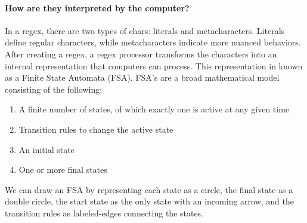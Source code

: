 \documentclass[10pt]{article}
\begin{document}
\paragraph{How are they interpreted by the computer?}
In a regex, there are two types of chars: literals and metacharacters.
Literals define regular characters, while metacharacters indicate
more nuanced behaviors.
After creating a regex, a regex processor transforms the characters into an internal
representation that computers can process.
This representation in known as a Finite State Automata (FSA).
FSA's are a broad mathematical model consisting of the following:
\begin{enumerate}
\item A finite number of states, of which exactly one is active at any given time
\item Transition rules to change the active state
\item An initial state
\item One or more final states
\end{enumerate}
We can draw an FSA by representing each state as a circle, the final state
as a double circle, the start state as the only state with an incoming arrow,
and the transition rules as labeled-edges connecting the states.
\end{document}
